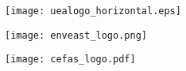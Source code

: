 \documentclass[paper=a4]{scrartcl}
\begin{document}
\begin{center}
\begin{minipage}{0.2\linewidth}
    \texttt{[image: uealogo\_horizontal.eps]}
\end{minipage}
\hspace{2cm}
\begin{minipage}{0.2\linewidth}
    \texttt{[image: enveast\_logo.png]}
\end{minipage}
\hspace{2cm}
\begin{minipage}{0.2\linewidth}
    \texttt{[image: cefas\_logo.pdf]}
\end{minipage}
\end{center}
\end{document}
